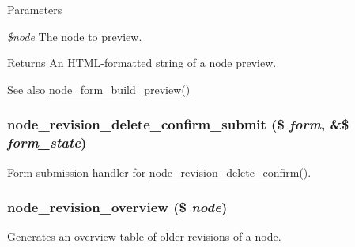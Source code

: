 \begin{DoxyParams}{Parameters}
\item[{\em \$node}]The node to preview.\end{DoxyParams}
\begin{DoxyReturn}{Returns}
An HTML-\/formatted string of a node preview.
\end{DoxyReturn}
\begin{DoxySeeAlso}{See also}
\hyperlink{node_8pages_8inc_a71425b02d4c0dd3af239bffdd7e1649b}{node\_\-form\_\-build\_\-preview()} 
\end{DoxySeeAlso}
\hypertarget{node_8pages_8inc_ad6e0dfda7fccc07dfd93dd257e8ed99f}{
\subsubsection[{node\_\-revision\_\-delete\_\-confirm\_\-submit}]{\setlength{\rightskip}{0pt plus 5cm}node\_\-revision\_\-delete\_\-confirm\_\-submit (\$ {\em form}, \/  \&\$ {\em form\_\-state})}}
\label{node_8pages_8inc_ad6e0dfda7fccc07dfd93dd257e8ed99f}
Form submission handler for \hyperlink{group__forms_gae46b8603fe31b65546854c92d5923b68}{node\_\-revision\_\-delete\_\-confirm()}. \hypertarget{node_8pages_8inc_a1654ae495e6814b2f08c7a8e4aeabd68}{
\subsubsection[{node\_\-revision\_\-overview}]{\setlength{\rightskip}{0pt plus 5cm}node\_\-revision\_\-overview (\$ {\em node})}}
\label{node_8pages_8inc_a1654ae495e6814b2f08c7a8e4aeabd68}
Generates an overview table of older revisions of a node.


